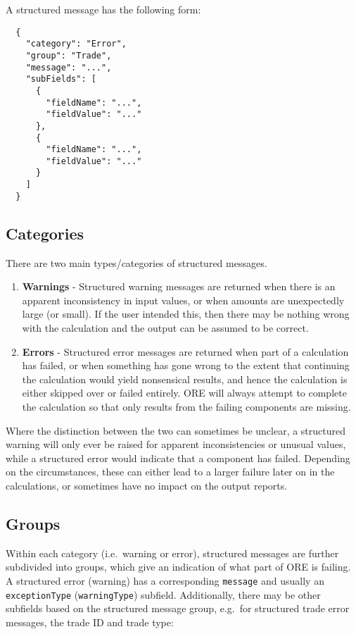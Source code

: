 A structured message has the following form:

\begin{verbatim}
  {
    "category": "Error",
    "group": "Trade",
    "message": "...",
    "subFields": [
      {
        "fieldName": "...",
        "fieldValue": "..."
      },
      {
        "fieldName": "...",
        "fieldValue": "..."
      }
    ]
  }
\end{verbatim}


\subsection{Categories}

There are two main types/categories of structured messages.
\begin{enumerate}
  \item \textbf{Warnings} - Structured warning messages are returned when there is an apparent inconsistency in input values, or when
  amounts are unexpectedly large (or small). If the user intended this, then there may be nothing wrong with the calculation and the
  output can be assumed to be correct.
  \item \textbf{Errors} - Structured error messages are returned when part of a calculation has failed, or when something has gone
  wrong to the extent that continuing the calculation would yield nonsensical results, and hence the calculation is either skipped
  over or failed entirely. ORE will always attempt to complete the calculation so that only results from the failing components are
  missing.
\end{enumerate}
Where the distinction between the two can sometimes be unclear, a structured warning will only ever be raised for apparent
inconsistencies or unusual values, while a structured error would indicate that a component has failed. Depending on the circumstances,
these can either lead to a larger failure later on in the calculations, or sometimes have no impact on the output reports.


\subsection{Groups}

Within each category (i.e.\ warning or error), structured messages are further subdivided into groups, which give an indication of what
part of ORE is failing. A structured error (warning) has a corresponding \lstinline!message! and usually an \lstinline!exceptionType!
(\lstinline!warningType!) subfield. Additionally, there may be other subfields based on the structured message group, e.g.\ for
structured trade error messages, the trade ID and trade type:


